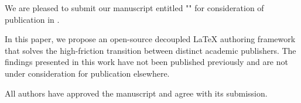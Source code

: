 \documentclass{../../packages/custom/cover_letter}
\begin{document}
\makeheader

We are pleased to submit our manuscript entitled "\thepapertitle" for consideration of publication in \thejournalname.

In this paper, we propose an open-source decoupled LaTeX authoring framework that solves the high-friction transition between distinct academic publishers. The findings presented in this work have not been published previously and are not under consideration for publication elsewhere.

All authors have approved the manuscript and agree with its submission.

\makeclosing
\end{document}
